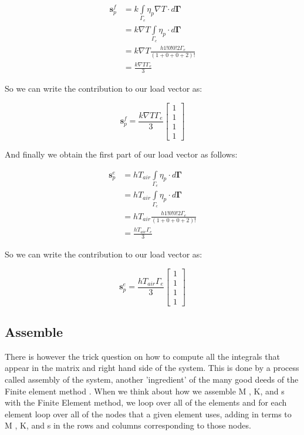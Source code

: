 \documentclass[12pt]{article}
\begin{document}
\begin{align*}
 \mathbf{s}_p^f &= k \int\limits_{\Gamma_{e}}{\eta_p\nabla T} \cdot d \mathbf{\Gamma} \\
 &= k \nabla T \int\limits_{\Gamma_{e}}{\eta_p} \cdot d \mathbf{\Gamma} \\
 &= k \nabla T \frac{h 1!0!0!2\Gamma_e}{(1+0+0+2)!} \\
 &= \frac{k\nabla T\Gamma_e}{3}
\end{align*}

So we can write the contribution to our load vector as:

\begin{equation}
\mathbf{s}_p^f = \frac{k\nabla T\Gamma_e}{3}
\begin{bmatrix} 1 \\ 1 \\ 1 \\ 1 
\end{bmatrix}
\end{equation}

And finally we obtain the first part of our load vector as follows:

\begin{align*}
 \mathbf{s}_p^e &= hT_{air} \int\limits_{\Gamma_{e}}{\eta_p} \cdot d \mathbf{\Gamma} \\
 &= hT_{air} \int\limits_{\Gamma_{e}}{\eta_p} \cdot d \mathbf{\Gamma} \\
 &= hT_{air} \frac{h 1!0!0!2\Gamma_e}{(1+0+0+2)!} \\
 &= \frac{hT_{air}\Gamma_e}{3}
\end{align*}

So we can write the contribution to our load vector as:

\begin{equation}
\mathbf{s}_p^e = \frac{hT_{air}\Gamma_e}{3}
\begin{bmatrix} 1 \\ 1 \\ 1 \\ 1 
\end{bmatrix}
\end{equation}

\subsection{Assemble}

There is however the trick question on how to compute all the integrals that appear in the matrix and right hand side of the
system. This is done by a process called assembly of the system, another 'ingredient' of the many good deeds of the Finite element method \cite{Sayas}. When we think about how we assemble M , K, and s with the Finite Element method, we loop over all of the elements and for each element loop over all of the nodes that a given element uses, adding in terms to M , K, and s in the rows and columns corresponding to those nodes. 
\end{document}
